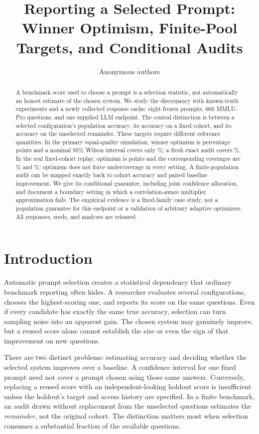 \documentclass{article}
\title{Reporting a Selected Prompt:\\Winner Optimism, Finite-Pool Targets, and Conditional Audits}
\author{Anonymous authors}
\begin{document}
\maketitle
\begin{abstract}
A benchmark score used to choose a prompt is a selection statistic, not automatically an honest estimate of the chosen system. We study the discrepancy with known-truth experiments and a newly collected response cache: eight frozen prompts, 600 MMLU-Pro questions, and one supplied LLM endpoint. The central distinction is between a selected configuration's population accuracy, its accuracy on a fixed cohort, and its accuracy on the unselected remainder. These targets require different reference quantities. In the primary equal-quality simulation, winner optimism is \OptSyn{} percentage points and a nominal 95\% Wilson interval covers only \SynNaiveCov\%; a fresh exact audit covers \SynAuditCov\%. In the real fixed-cohort replay, optimism is \OptReal{} points and the corresponding coverages are \RealNaiveCov\% and \RealAuditCov\%: optimism does not force undercoverage in every setting. A finite-population audit can be mapped exactly back to cohort accuracy and paired baseline improvement. We give its conditional guarantee, including joint confidence allocation, and document a boundary setting in which a correlation-aware multiplier approximation fails. The empirical evidence is a fixed-family case study, not a population guarantee for this endpoint or a validation of arbitrary adaptive optimizers. All responses, seeds, and analyses are released.
\end{abstract}

\section{Introduction}
Automatic prompt selection creates a statistical dependency that ordinary benchmark reporting often hides. A researcher evaluates several configurations, chooses the highest-scoring one, and reports its score on the same questions. Even if every candidate has exactly the same true accuracy, selection can turn sampling noise into an apparent gain. The chosen system may genuinely improve, but a reused score alone cannot establish the size or even the sign of that improvement on new questions.

There are two distinct problems: estimating accuracy and deciding whether the selected system improves over a baseline. A confidence interval for one fixed prompt need not cover a prompt chosen using those same answers. Conversely, replacing a reused score with an independent-looking holdout score is insufficient unless the holdout's target and access history are specified. In a finite benchmark, an audit drawn without replacement from the unselected questions estimates the \emph{remainder}, not the original cohort. The distinction matters most when selection consumes a substantial fraction of the available questions.
\end{document}
